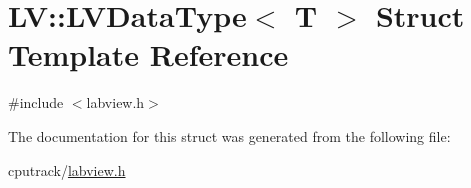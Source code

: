 \hypertarget{struct_l_v_1_1_l_v_data_type}{}\section{LV\+:\+:L\+V\+Data\+Type$<$ T $>$ Struct Template Reference}
\label{struct_l_v_1_1_l_v_data_type}


{\ttfamily \#include $<$labview.\+h$>$}



The documentation for this struct was generated from the following file\+:\begin{DoxyCompactItemize}
\item 
cputrack/\hyperlink{labview_8h}{labview.\+h}\end{DoxyCompactItemize}
